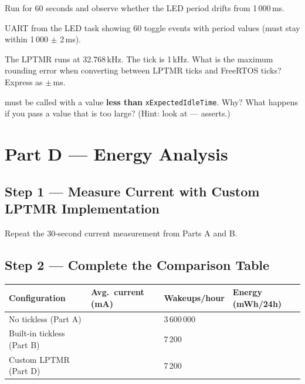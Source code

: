 \documentclass[11pt, a4paper]{article}
\begin{document}
Run for 60 seconds and observe whether the LED period drifts from 1\,000\,ms.

\begin{checkpointbox}[~C]
  UART from the LED task showing 60 toggle events with period values (must stay
  within 1\,000 $\pm$ 2\,ms).
\end{checkpointbox}

\begin{questionbox}[~C1]
  The LPTMR runs at 32.768\,kHz. The tick is 1\,kHz. What is the maximum rounding
  error when converting between LPTMR ticks and FreeRTOS ticks? Express as $\pm$\,ms.
\end{questionbox}

\begin{questionbox}[~C2]
   must be called with a value \textbf{less than}
  \texttt{xExpectedIdleTime}. Why? What happens if you pass a value that is too large?
  (Hint: look at  ---  asserts.)
\end{questionbox}

\section{Part D --- Energy Analysis}

\subsection{Step 1 --- Measure Current with Custom LPTMR Implementation}

Repeat the 30-second current measurement from Parts A and B.

\subsection{Step 2 --- Complete the Comparison Table}

\renewcommand{\arraystretch}{1.4}
\begin{tabular}{@{} p{4.5cm} p{2.8cm} p{2.4cm} p{2.8cm} @{}}
  \toprule
  \textbf{Configuration} & \textbf{Avg.\ current (mA)} & \textbf{Wakeups/hour} &
  \textbf{Energy (mWh/24h)} \\
  \midrule
  No tickless (Part A) & & 3\,600\,000 & \\
  Built-in tickless (Part B) & & 7\,200 & \\
  Custom LPTMR (Part D) & & 7\,200 & \\
  \bottomrule
\end{tabular}
\renewcommand{\arraystretch}{1}
\end{document}
